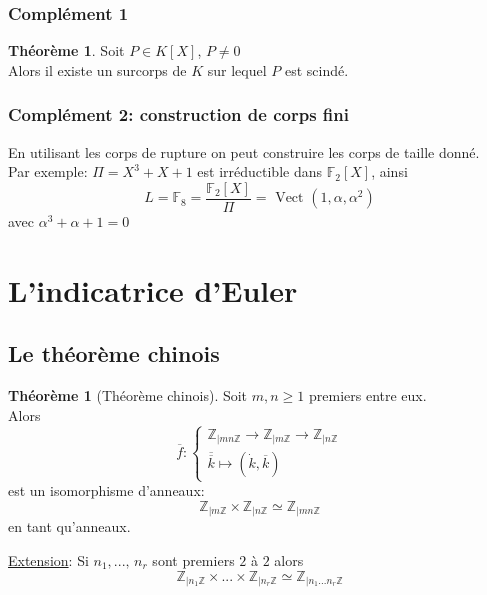 \documentclass[10pt,a4paper]{article}
\theoremstyle{definition}
\newtheorem{theorem}[proposition]{Théorème}
\begin{document}
\subsubsection{Complément 1}
\begin{theorem}
Soit $P \in K[X]$, $P \neq 0$ \\
Alors il existe un surcorps de $K$ sur lequel $P$ est scindé.
\end{theorem}

\subsubsection{Complément 2: construction de corps fini}
\noindent En utilisant les corps de rupture on peut construire les corps de taille donné. \\
Par exemple: $\Pi = X^3 + X + 1$ est irréductible dans $\mathbb{F}_2[X]$, ainsi
\[ L = \mathbb{F}_8 = \frac{\mathbb{F}_2[X]}{\Pi} = \text{ Vect }(1, \alpha, \alpha^2) \]
avec $\alpha^3 + \alpha + 1 = 0$

\section{L'indicatrice d'Euler}
\subsection{Le théorème chinois}
\begin{theorem}[Théorème chinois]
Soit $m, n \geq 1$ premiers entre eux. \\
Alors 
\[ \overline{f} : \begin{cases}
\mathbb{Z}_{|mn\mathbb{Z}} \to \mathbb{Z}_{|m\mathbb{Z}} \to \mathbb{Z}_{|n\mathbb{Z}} \\
\overline{\overline{k}} \mapsto (\dot{k}, \overline{k})
\end{cases} \]
est un isomorphisme d'anneaux: 
\[ \mathbb{Z}_{|m\mathbb{Z}} \times \mathbb{Z}_{|n\mathbb{Z}} \simeq \mathbb{Z}_{|mn\mathbb{Z}} \]
en tant qu'anneaux.
\end{theorem}
\noindent \uline{Extension}: Si $n_1, ...,\, n_r$ sont premiers $2$ à $2$ alors
\[ \mathbb{Z}_{|n_1 \mathbb{Z}} \times ... \times \mathbb{Z}_{|n_r \mathbb{Z}} \simeq \mathbb{Z}_{|n_1 ... n_r \mathbb{Z}} \]
\end{document}
